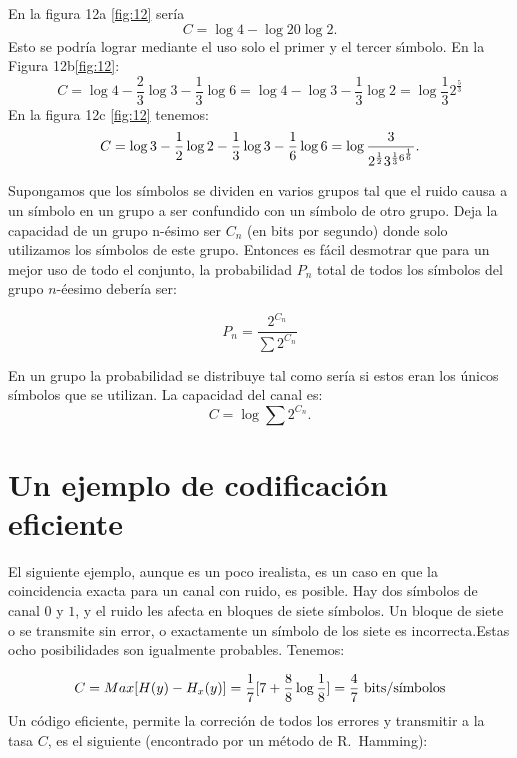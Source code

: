 En la figura 12a \ref{fig:12} ser\'ia
\begin{equation}
  C =  \log{4} - \log{2} 0 \log{2}.
\end{equation}
Esto se podr\'ia lograr mediante el uso solo el primer y el tercer
s\'{\i}mbolo. En la Figura 12b\ref{fig:12}:
\begin{equation}
  C = \log{4} - \frac{2}{3}\log{3} - \frac{1}{3}\log{6}
  = \log{4} - \log{3} - \frac{1}{3}\log{2}
  = \log{\frac{1}{3}} 2^{\frac{5}{3}}
\end{equation}
En la figura 12c \ref{fig:12} tenemos:
\begin{equation}
  C = \log{3} - \frac{1}{2}\log{2} - \frac{1}{3}\log{3} - \frac{1}{6} \log{6} \\
  = \log  {\frac{3}{ 2^{\frac{1}{2}} 3^{\frac{1}{3} 6^{\frac{1}{6} }}}}.
\end{equation}

Supongamos que los s\'imbolos se dividen en varios grupos tal que el
ruido causa a un s\'imbolo en un grupo a ser confundido con un
s\'imbolo de otro grupo. Deja la capacidad de un grupo n-\'esimo ser
$C_n$ (en bits por segundo) donde solo utilizamos los s\'imbolos de
este grupo. Entonces es f\'acil desmotrar que para un mejor uso de todo el conjunto, la
probabilidad $P_n$ total de todos los s\'imbolos del grupo $n$-\'{e}esimo
deber\'ia ser:

\begin{equation}
  P_n = \frac{2^{C_n}}{\sum 2^{C_n}}
\end{equation}

En un grupo la probabilidad se distribuye tal como ser\'ia si estos eran los \'unicos s\'imbolos que se utilizan. 
La capacidad del canal es:
\begin{equation}
  C = \log{\sum 2^{C_n}}.
\end{equation}

\clearpage

\chapter{Un ejemplo de codificaci\'on eficiente}
\label{sec:17}

El siguiente ejemplo, aunque es un poco irealista, es un caso en que la
coincidencia exacta para un canal con ruido, es posible. Hay dos
s\'imbolos de canal $0$ y $1$, y el ruido les afecta en bloques de siete
s\'imbolos.  Un bloque de siete o se transmite sin error, o
exactamente un s\'imbolo de los siete es incorrecta.Estas ocho
posibilidades son igualmente probables. Tenemos:

\begin{equation}
C = Max [ H(y) - H_x(y) ]
= \frac{1}{7}[7 + \frac{8}{8}\log{\frac{1}{8}}]
= \frac{4}{7} \text{ bits}/\text{s\'{\i}mbolos}
\end{equation}
Un c\'odigo eficiente, permite la correci\'on de todos los errores y
transmitir a la tasa $C$, es el siguiente (encontrado por un m\'etodo
de R.\ Hamming):
